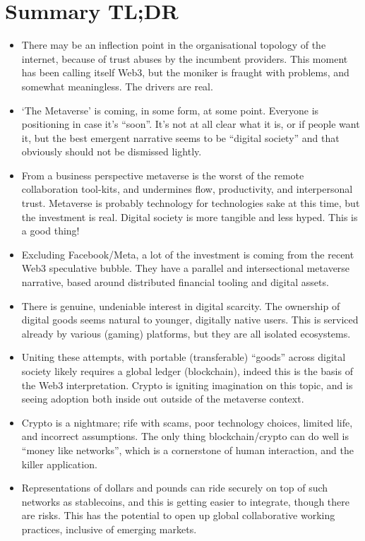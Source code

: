 \section{Summary TL;DR}
\label{sec:tldr}
\begin{itemize}
\item There may be an inflection point in the organisational topology of the internet, because of trust abuses by the incumbent providers. This moment has been calling itself Web3, but the moniker is fraught with problems, and somewhat meaningless. The drivers are real.
\item `The Metaverse' is coming, in some form, at some point. Everyone is positioning in case it's ``soon''. It's not at all clear what it is, or if people want it, but the best emergent narrative seems to be ``digital society'' and that obviously should not be dismissed lightly.
\item From a business perspective metaverse is the worst of the remote collaboration tool-kits, and undermines flow, productivity, and interpersonal trust. Metaverse is probably technology for technologies sake at this time, but the investment is real. Digital society is more tangible and less hyped. This is a good thing!
\item Excluding Facebook/Meta, a lot of the investment is coming from the recent Web3 speculative bubble. They have a parallel and intersectional metaverse narrative, based around distributed financial tooling and digital assets. 
\item There is genuine, undeniable interest in digital scarcity. The ownership of digital goods seems natural to younger, digitally native users. This is serviced already by various (gaming) platforms, but they are all isolated ecosystems.
\item Uniting these attempts, with portable (transferable) ``goods'' across digital society likely requires a global ledger (blockchain), indeed this is the basis of the Web3 interpretation. Crypto is igniting imagination on this topic, and is seeing adoption both inside out outside of the metaverse context.
\item Crypto is a nightmare; rife with scams, poor technology choices, limited life, and incorrect assumptions. The only thing blockchain/crypto can do well is ``money like networks'', which is a cornerstone of human interaction, and the killer application.
\item Representations of dollars and pounds can ride securely on top of such networks as stablecoins, and this is getting easier to integrate, though there are risks. This has the potential to open up global collaborative working practices, inclusive of emerging markets.

\end{itemize}
